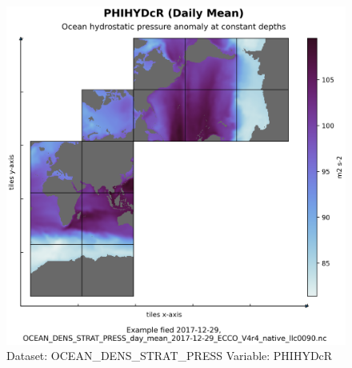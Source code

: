 \begin{figure}[H]
\centering
\includegraphics[width=\textwidth]{../images/plots/native_plots/Ocean_Density_Stratification_and_Hydrostatic_Pressure/PHIHYDcR.png}
\caption{Dataset: OCEAN\_DENS\_STRAT\_PRESS Variable: PHIHYDcR}
\label{tab:table-OCEAN_DENS_STRAT_PRESS_PHIHYDcR-Plot}
\end{figure}
\pagebreak
